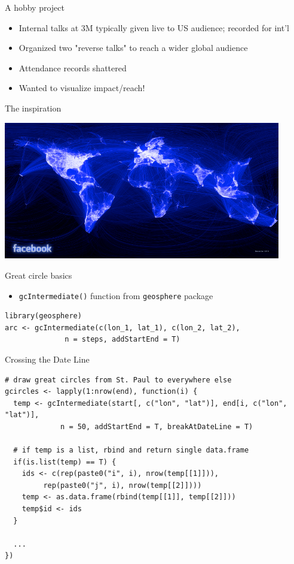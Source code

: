 \documentclass[sans,aspectratio=169,presentation,bigger,fleqn]{beamer}
\begin{document}
\begin{frame}[label=sec-15]{A hobby project}
\begin{itemize}
\item Internal talks at 3M typically given live to US audience; recorded for int'l
\item Organized two "reverse talks" to reach a wider global audience
\item Attendance records shattered
\item Wanted to visualize impact/reach!
\end{itemize}
\end{frame}
\begin{frame}[label=sec-16]{The inspiration}
\begin{center}
\includegraphics[height=6cm]{./img/facebook-map-lo.png}
\end{center}
\end{frame}
\begin{frame}[fragile,label=sec-17]{Great circle basics}
 \begin{itemize}
\item \texttt{gcIntermediate()} function from  \texttt{geosphere} package
\end{itemize}

\scriptsize
\begin{verbatim}
library(geosphere)
arc <- gcIntermediate(c(lon_1, lat_1), c(lon_2, lat_2),
		      n = steps, addStartEnd = T)
\end{verbatim}
\end{frame}
\begin{frame}[fragile,label=sec-18]{Crossing the Date Line}
 \scriptsize
\begin{verbatim}
# draw great circles from St. Paul to everywhere else
gcircles <- lapply(1:nrow(end), function(i) {
  temp <- gcIntermediate(start[, c("lon", "lat")], end[i, c("lon", "lat")],
			 n = 50, addStartEnd = T, breakAtDateLine = T)

  # if temp is a list, rbind and return single data.frame
  if(is.list(temp) == T) {
    ids <- c(rep(paste0("i", i), nrow(temp[[1]])),
	     rep(paste0("j", i), nrow(temp[[2]])))
    temp <- as.data.frame(rbind(temp[[1]], temp[[2]]))
    temp$id <- ids
  }

  ...
})
\end{verbatim}
\normalsize
\end{frame}
\end{document}
